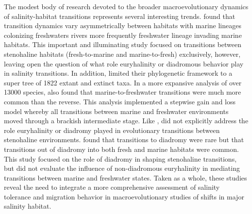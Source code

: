 \documentclass[11pt]{article}
\begin{document}
The modest body of research devoted to the broader macroevolutionary dynamics of salinity-habitat transitions represents several interesting trends. \cite{betancur2015fossil} found that transition dynamics vary asymmetrically between habitats with marine lineages colonizing freshwaters rivers more frequently freshwater lineage invading marine habitats. This important and illuminating study focused on transitions between stenohaline habitats (fresh-to-marine and marine-to-fresh) exclusively, however, leaving open the question of what role euryhalinity or diadromous behavior play in salinity transitions. In addition, \cite{betancur2015fossil} limited their phylogenetic framework to a super tree of 1822 extant and extinct taxa. In a more expansive analysis of over 13000 species, \cite{rabosky2020speciation} also found that marine-to-freshwater transitions were much more common than the reverse. This analysis implemented a stepwise gain and loss model whereby all transitions between marine and freshwater environments moved through a brackish intermediate stage. Like \cite{betancur2015fossil}, \cite{rabosky2020speciation} did not explicitly address the role euryhalinity or diadromy played in evolutionary transitions between stenohaline environments. \cite{corush2019evolutionary} found that transitions to diadromy were rare but that transitions out of diadromy into both fresh and marine habitats were common. This study focused on the role of diadromy in shaping stenohaline transitions, but did not evaluate the influence of non-diadromous euryhalinity in mediating transitions between marine and freshwater states. Taken as a whole, these studies reveal the need to integrate a more comprehensive assessment of salinity tolerance and migration behavior in macroevolutionary studies of shifts in major salinity habitat.
                                        
\end{document}
